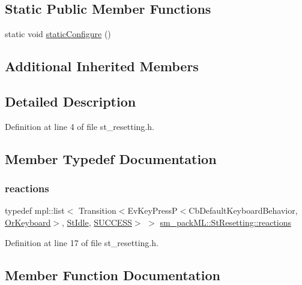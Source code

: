 \subsection*{Static Public Member Functions}
\begin{DoxyCompactItemize}
\item 
static void \hyperlink{structsm__packML_1_1StResetting_a4c1f24d4cab96fd914b31e41c21ab98e}{static\+Configure} ()
\end{DoxyCompactItemize}
\subsection*{Additional Inherited Members}


\subsection{Detailed Description}


Definition at line 4 of file st\+\_\+resetting.\+h.



\subsection{Member Typedef Documentation}
\mbox{\label{structsm__packML_1_1StResetting_adb5a25459b59cd84a9912fde9282395c}} 
\subsubsection{\texorpdfstring{reactions}{reactions}}
{\footnotesize\ttfamily typedef mpl\+::list$<$ Transition$<$Ev\+Key\+PressP$<$Cb\+Default\+Keyboard\+Behavior, \hyperlink{classsm__packML_1_1OrKeyboard}{Or\+Keyboard}$>$, \hyperlink{structsm__packML_1_1StIdle}{St\+Idle}, \hyperlink{classSUCCESS}{S\+U\+C\+C\+E\+SS}$>$ $>$ \hyperlink{structsm__packML_1_1StResetting_adb5a25459b59cd84a9912fde9282395c}{sm\+\_\+pack\+M\+L\+::\+St\+Resetting\+::reactions}}



Definition at line 17 of file st\+\_\+resetting.\+h.



\subsection{Member Function Documentation}
\mbox{\label{structsm__packML_1_1StResetting_a994a59cfdc6092d4a2652479305f7227}} 
